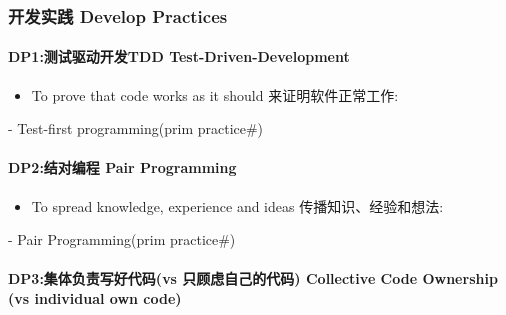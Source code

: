 \hypertarget{ux5f00ux53d1ux5b9eux8df5-develop-practices}{%
\subsubsection{开发实践 Develop
Practices}\label{ux5f00ux53d1ux5b9eux8df5-develop-practices}}

\hypertarget{dp1ux6d4bux8bd5ux9a71ux52a8ux5f00ux53d1tdd-test-driven-development}{%
\paragraph{DP1:测试驱动开发TDD
Test-Driven-Development}\label{dp1ux6d4bux8bd5ux9a71ux52a8ux5f00ux53d1tdd-test-driven-development}}

\begin{itemize}
\tightlist
\item
  To prove that code works as it should 来证明软件正常工作:\\
\end{itemize}

\begin{description}
\tightlist
\item[]
- Test-first programming(prim practice\#)
\end{description}

\hypertarget{dp2ux7ed3ux5bf9ux7f16ux7a0b-pair-programming}{%
\paragraph{DP2:结对编程 Pair
Programming}\label{dp2ux7ed3ux5bf9ux7f16ux7a0b-pair-programming}}

\begin{itemize}
\tightlist
\item
  To spread knowledge, experience and ideas 传播知识、经验和想法:\\
\end{itemize}

\begin{description}
\tightlist
\item[]
- Pair Programming(prim practice\#)
\end{description}

\hypertarget{dp3ux96c6ux4f53ux8d1fux8d23ux5199ux597dux4ee3ux7801vs-ux53eaux987eux8651ux81eaux5df1ux7684ux4ee3ux7801-collective-code-ownership-vs-individual-own-code}{%
\paragraph{DP3:集体负责写好代码(vs 只顾虑自己的代码) Collective Code
Ownership (vs individual own
code)}\label{dp3ux96c6ux4f53ux8d1fux8d23ux5199ux597dux4ee3ux7801vs-ux53eaux987eux8651ux81eaux5df1ux7684ux4ee3ux7801-collective-code-ownership-vs-individual-own-code}}

